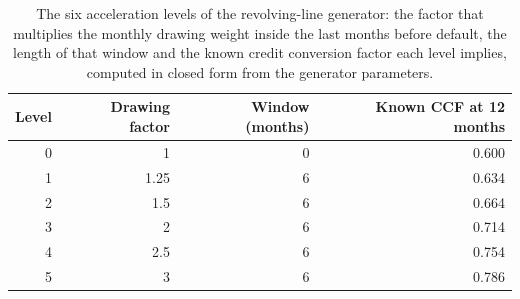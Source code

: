 \begin{table}[htbp]
\centering
\small
\caption{The six acceleration levels of the revolving-line generator: the factor that multiplies the monthly drawing weight inside the last months before default, the length of that window and the known credit conversion factor each level implies, computed in closed form from the generator parameters.}
\label{tab:lgd-ead-levels-def}
\begin{tabular}{rrrr}
\toprule
Level & Drawing factor & Window (months) & Known CCF at 12 months \\
\midrule
0 & 1 & 0 & 0.600 \\
1 & 1.25 & 6 & 0.634 \\
2 & 1.5 & 6 & 0.664 \\
3 & 2 & 6 & 0.714 \\
4 & 2.5 & 6 & 0.754 \\
5 & 3 & 6 & 0.786 \\
\bottomrule
\end{tabular}
\end{table}
